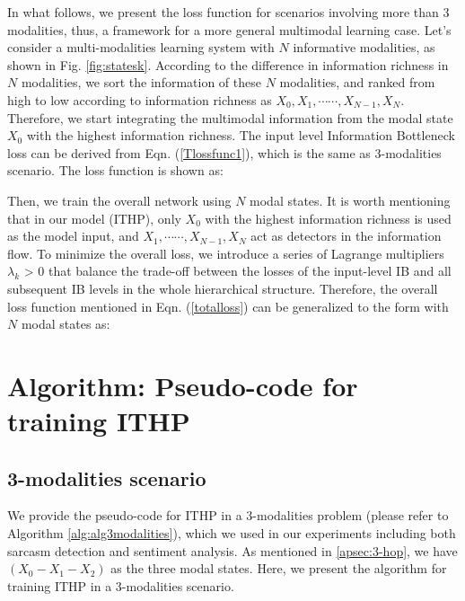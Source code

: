 \documentclass{article} %
\begin{document}


In what follows, we present the loss function for scenarios involving more than 3 modalities, thus, a framework for a more general multimodal learning case. Let's consider a multi-modalities learning system with $N$ informative modalities, as shown in Fig. \ref{fig:statesk}. According to the difference in information richness in $N$ modalities, we sort the information of these $N$ modalities, and ranked from high to low according to information richness as $X_{0}, X_{1},\cdots\cdots,X_{N-1} ,X_{N}$. Therefore, we start integrating the multimodal information from the modal state $X_{0}$ with the highest information richness. The input level Information Bottleneck loss can be derived from Eqn. (\ref{Tlossfunc1}), which is the same as 3-modalities scenario. The loss function is shown as:



Then, we train the overall network using $N$ modal states. It is worth mentioning that in our model (ITHP), only $X_{0}$ with the highest information richness is used as the model input, and $X_{1},\cdots\cdots,X_{N-1} ,X_{N}$ act as detectors in the information flow. To minimize the overall loss, we introduce a series of Lagrange multipliers $\lambda_{k}$ > 0 that balance the trade-off between the losses of the input-level IB and all subsequent IB levels in the whole hierarchical structure. Therefore, the overall loss function mentioned in Eqn. (\ref{totalloss}) can be generalized to the form with $N$ modal states as:




\section{Algorithm: Pseudo-code for training ITHP}
\label{apsec:algorithm}

\subsection{3-modalities scenario}
\label{apsec:D-3-hop}
We provide the pseudo-code for ITHP in a 3-modalities problem (please refer to Algorithm \ref{alg:alg3modalities}), which we used in our experiments including both sarcasm detection and sentiment analysis. As mentioned in \ref{apsec:3-hop}, we have $(X_{0} - X_{1} - X_{2} )$ as the three modal states. Here, we present the algorithm for training ITHP in a 3-modalities scenario.
\end{document}
